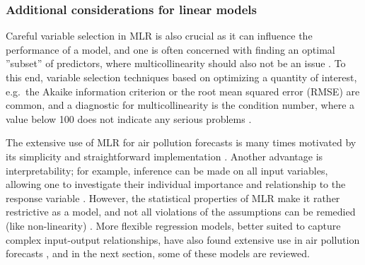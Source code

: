 \subsubsection{Additional considerations for linear models}
Careful variable selection in MLR is also crucial as it can influence the performance of a model, and one is often concerned with finding an optimal ”subset” of predictors, where multicollinearity should also not be an issue \cite{Montgomery2012}. To this end, variable selection techniques based on optimizing a quantity of interest, e.g.\ the Akaike information criterion or the root mean squared error (RMSE) are common, and a diagnostic for multicollinearity is the condition number, where a value below 100 does not indicate any serious problems \cite{Montgomery2012}. 

The extensive use of MLR for air pollution forecasts is many times motivated by its simplicity and straightforward implementation \cite{atmos7020015}. Another advantage is interpretability; for example, inference can be made on all input variables, allowing one to investigate their individual importance and relationship to the response variable \cite{Montgomery2012}. However, the statistical properties of MLR make it rather restrictive as a model, and not all violations of the assumptions can be remedied (like non-linearity) \cite{Montgomery2015}. More flexible regression models, better suited to capture complex input-output relationships, have also found extensive use in air pollution forecasts \cite{atmos7020015}, and in the next section, some of these models are reviewed. 




